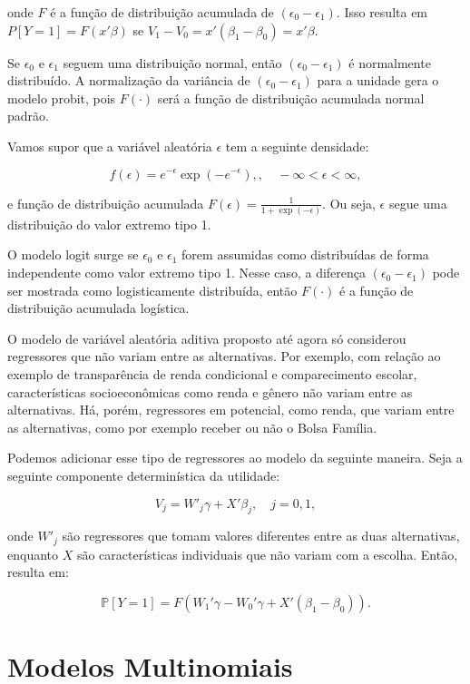 \documentclass[12pt, a4paper, openany]{book}
\numberwithin{equation}{chapter}
\numberwithin{table}{chapter}
\numberwithin{figure}{chapter}
\theoremstyle{break}
\newcommand{\Pb}{\mathbb{P}}
\begin{document}
onde \( F \) é a função de distribuição acumulada de \( (\epsilon_0 - \epsilon_1) \). Isso resulta em \( P[Y = 1] = F({x}'{\beta}) \) se \( V_1 - V_0 = {x}'({\beta}_1 - {\beta}_0) = {x}'{\beta} \).

Se \( \epsilon_0 \) e \( \epsilon_1 \) seguem uma distribuição normal, então \( (\epsilon_0 - \epsilon_1) \) é normalmente distribuído. A normalização da variância de \( (\epsilon_0 - \epsilon_1) \) para a unidade gera o modelo probit, pois \( F(\cdot) \) será a função de distribuição acumulada normal padrão.

Vamos supor que a variável aleatória \( \epsilon \) tem a seguinte densidade:

\[
f(\epsilon) = e^{-\epsilon} \exp(-e^{-\epsilon}),
, \quad -\infty < \epsilon < \infty, 
\]

e função de distribuição acumulada \( F(\epsilon) = \frac{1}{1 + \exp(-\epsilon)} \). Ou seja, \( \epsilon \) segue uma distribuição do valor extremo tipo 1.

O modelo logit surge se \( \epsilon_0 \) e \(\epsilon_1 \) forem assumidas como distribuídas de forma independente como valor extremo tipo 1. Nesse caso, a diferença \( (\epsilon_0 - \epsilon_1) \) pode ser mostrada como logisticamente distribuída, então \( F(\cdot) \) é a função de distribuição acumulada logística.

O modelo de variável aleatória aditiva proposto até agora só considerou regressores que não variam entre as alternativas. Por exemplo, com relação ao exemplo de transparência de renda condicional e comparecimento escolar, características socioeconômicas como renda e gênero não variam entre as alternativas. Há, porém, regressores em potencial, como renda, que variam entre as alternativas, como por exemplo receber ou não o Bolsa Família.

Podemos adicionar esse tipo de regressores ao modelo da seguinte maneira. Seja a seguinte componente determinística da utilidade:

\[
V_{j} =  {W}'_j{\gamma} + {X}' {\beta}_j, \quad j = 0, 1,
\]

onde \( {W}'_j \) são regressores que tomam valores diferentes entre as duas alternativas, enquanto 
\( {X} \) são características individuais que não variam com a escolha. Então, resulta em:

\[
\Pb[Y = 1] = F\left({W}_{1}'{\gamma} - {W}_{0}'{\gamma} + {X}'({\beta}_1 - {\beta}_0)\right).
\]

\section{Modelos Multinomiais}
\end{document}
